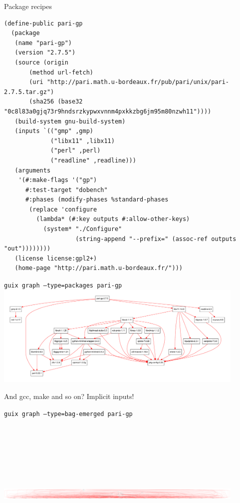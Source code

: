 \documentclass [t]{beamer}
\begin{document}
\begin{frame}[fragile]{Package recipes}
\vspace {-5mm}
\scriptsize
\begin{verbatim}
(define-public pari-gp
  (package
   (name "pari-gp")
   (version "2.7.5")
   (source (origin
       (method url-fetch)
       (uri "http://pari.math.u-bordeaux.fr/pub/pari/unix/pari-2.7.5.tar.gz")
       (sha256 (base32 "0c8l83a0gjq73r9hndsrzkypwxvnnm4pxkkzbg6jm95m80nzwh11"))))
   (build-system gnu-build-system)
   (inputs `(("gmp" ,gmp)
             ("libx11" ,libx11)
             ("perl" ,perl)
             ("readline" ,readline)))
   (arguments
    '(#:make-flags '("gp")
      #:test-target "dobench"
      #:phases (modify-phases %standard-phases
       (replace 'configure
         (lambda* (#:key outputs #:allow-other-keys)
           (system* "./Configure"
                    (string-append "--prefix=" (assoc-ref outputs "out"))))))))
   (license license:gpl2+)
   (home-page "http://pari.math.u-bordeaux.fr/")))
\end{verbatim}
\end{frame}


\begin {frame}{\texttt {guix graph --type=packages pari-gp}}
\includegraphics [width=12cm]{images/graph-parigp-packages.pdf}

\vfill
And gcc, make and so on? Implicit inputs!
\end {frame}


\begin {frame}{\texttt {guix graph --type=bag-emerged pari-gp}}
\includegraphics [height=8cm,width=12cm]{images/graph-parigp-bag-emerged.pdf}
\end {frame}
\end{document}
